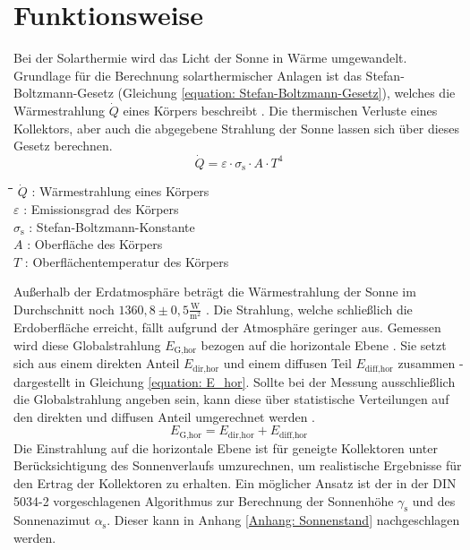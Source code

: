 \section{Funktionsweise}\label{Funktionsweise Solarthermische Wärmebereitstellung}
Bei der Solarthermie wird das Licht der Sonne in Wärme umgewandelt. Grundlage für die Berechnung solarthermischer Anlagen ist das Stefan-Boltzmann-Gesetz (Gleichung \ref{equation: Stefan-Boltzmann-Gesetz}), welches die Wärmestrahlung $\dot{Q}$ eines Körpers beschreibt \cite{stefan1879}. Die thermischen Verluste eines Kollektors, aber auch die abgegebene Strahlung der Sonne lassen sich über dieses Gesetz berechnen. 
\begin{equation}\label{equation: Stefan-Boltzmann-Gesetz}
\dot{Q} = \varepsilon \cdot \sigma_\text{s} \cdot A \cdot T^4
\end{equation}
\begin{tabbing}
	\hspace{1cm}\=\hspace{0.5cm}\=\hspace{0.5cm}\=\hspace{1cm}\=\kill
	\> $\dot{Q}$ \>: \> Wärmestrahlung eines Körpers\\
	\> $\varepsilon$ \>:  \> Emissionsgrad des Körpers\\
	\> $\sigma_\text{s}$ \>: \> Stefan-Boltzmann-Konstante\\
	\> $A$ \>: \> Oberfläche des Körpers\\
	\> $T$ \>: \> Oberflächentemperatur des Körpers\\
\end{tabbing}
Außerhalb der Erdatmosphäre beträgt die Wärmestrahlung der Sonne im Durchschnitt noch $1360,8 \pm 0,5 \frac{\text{W}}{\text{m}^2}$ \cite{Quaschning2015}. Die Strahlung, welche schließlich die Erdoberfläche erreicht, fällt aufgrund der Atmosphäre geringer aus. Gemessen wird diese Globalstrahlung $E_\text{G,hor}$ bezogen auf die horizontale Ebene \cite{DWDstrahlung}. Sie setzt sich aus einem direkten Anteil $E_\text{dir,hor}$ und einem diffusen Teil $E_\text{diff,hor}$ zusammen - dargestellt in Gleichung \ref{equation: E_hor}. Sollte bei der Messung ausschließlich die Globalstrahlung angeben sein, kann diese über statistische Verteilungen auf den direkten und diffusen Anteil umgerechnet werden \cite{Quaschning2015}.
\begin{equation}
\label{equation: E_hor}
E_\text{G,hor} = E_\text{dir,hor} + E_\text{diff,hor}
\end{equation}
Die Einstrahlung auf die horizontale Ebene ist für geneigte Kollektoren unter Berücksichtigung des Sonnenverlaufs umzurechnen, um realistische Ergebnisse für den Ertrag der Kollektoren zu erhalten. Ein möglicher Ansatz ist der in der DIN 5034-2 \cite{DIN5034} vorgeschlagenen Algorithmus zur Berechnung der Sonnenhöhe $\gamma_\text{s}$ und des Sonnenazimut $\alpha_\text{s}$. Dieser kann in Anhang \ref{Anhang: Sonnenstand} nachgeschlagen werden.

